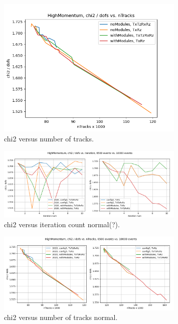 \begin{figure}
  \centering
  \includegraphics[width=0.8\textwidth]{plots/nov_21/chi2_vs_ntracks_all.png}
  \caption{chi2 versus number of tracks.}
  \label{fig:chi2tracks}
\end{figure}

\begin{figure}
  \centering
  \includegraphics[width=0.8\textwidth]{plots/LHCB_week_dec/chi2_vs_iter_normal.png}
  \caption{chi2 versus iteration count normal(?).}
  \label{fig:chi2iterdec}
\end{figure}

\begin{figure}
  \centering
  \includegraphics[width=0.8\textwidth]{plots/LHCB_week_dec/chi2_vs_tracks_normal.png}
  \caption{chi2 versus number of tracks normal.}
  \label{fig:chi2tracksdec}
\end{figure}

